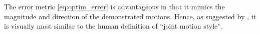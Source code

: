 \documentclass[letterpaper, 10 pt, conference,fleqn]{ieeeconf}
\begin{document}


The error metric \eqref{eq:optim_error} is advantageous in that it mimics the magnitude and direction of the demonstrated motions. Hence, as suggested by \cite{gielniak2010stylized}, it is visually most similar to the human definition of ``joint motion style".




\end{document}
